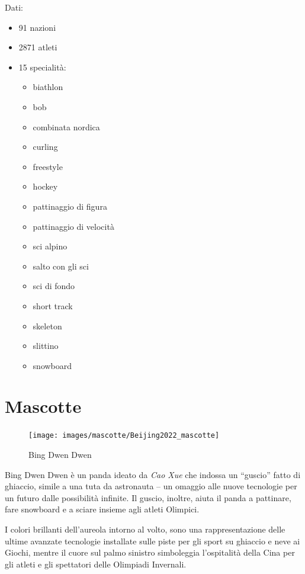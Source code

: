 \documentclass[
]{book}
\providecommand{\tightlist}{%
  \setlength{\itemsep}{0pt}\setlength{\parskip}{0pt}}
\begin{document}
Dati:

\begin{itemize}
\tightlist
\item
  91 nazioni
\item
  2871 atleti
\item
  15 specialità:

  \begin{itemize}
  \tightlist
  \item
    biathlon
  \item
    bob
  \item
    combinata nordica
  \item
    curling
  \item
    freestyle
  \item
    hockey
  \item
    pattinaggio di figura
  \item
    pattinaggio di velocità
  \item
    sci alpino
  \item
    salto con gli sci
  \item
    sci di fondo
  \item
    short track
  \item
    skeleton
  \item
    slittino
  \item
    snowboard
  \end{itemize}
\end{itemize}

\section*{Mascotte}\label{mascotte-13}

\begin{figure}
\texttt{[image: images/mascotte/Beijing2022\_mascotte]} \caption{Bing Dwen Dwen}\label{fig:unnamed-chunk-93}
\end{figure}

Bing Dwen Dwen è un panda ideato da \emph{Cao Xue} che indossa un ``guscio'' fatto di ghiaccio, simile a una tuta da astronauta -- un omaggio alle nuove tecnologie per un futuro dalle possibilità infinite. Il guscio, inoltre, aiuta il panda a pattinare, fare snowboard e a sciare insieme agli atleti Olimpici.

I colori brillanti dell'aureola intorno al volto, sono una rappresentazione delle ultime avanzate tecnologie installate sulle piste per gli sport su ghiaccio e neve ai Giochi, mentre il cuore sul palmo sinistro simboleggia l'ospitalità della Cina per gli atleti e gli spettatori delle Olimpiadi Invernali.
\end{document}

